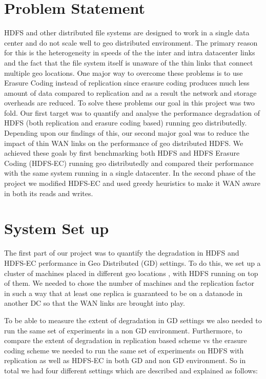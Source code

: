 \documentclass{sig-alternate-05-2015}
\begin{document}
\maketitle
\section{Problem Statement}
HDFS and other distributed file systems are designed to work in a single data center and do not scale well to geo distributed environment. The primary reason for this is the heterogeneity in speeds of the the inter and intra datacenter links and the fact that the file system itself is unaware of the thin links that connect multiple geo locations. One major way to overcome these problems is to use Erasure Coding instead of replication since erasure coding produces much less amount of data compared to replication and as a result the network and storage overheads are reduced. To solve these problems our goal in this project was two fold. Our first target was to quantify and analyse the performance degradation of HDFS (both replication and erasure coding based) running geo distributedly. Depending upon our findings of this, our second major goal was to reduce the impact of thin WAN links on the performance of geo distributed HDFS. We achieved these goals by first benchmarking both HDFS and HDFS Erasure Coding (HDFS-EC) running geo distributedly and compared their performance with the same system running in a single datacenter. In the second phase of the project we modified HDFS-EC and used greedy heuristics to make it WAN aware in both its reads and writes.

%
\printccsdesc



\section{System Set up}
The first part of our project was to quantify the degradation in HDFS and HDFS-EC performance in Geo Distributed (GD) settings. To do this, we set up a cluster of machines placed in different geo locations , with HDFS running on top of them. We needed to chose the number of machines and the replication factor in such a way that at least one replica is guaranteed to be on a datanode in another DC so that the WAN links are brought into play. 

To be able to measure the extent of degradation in GD settings we also needed to run the same set of experiments in a non GD environment. Furthermore, to compare the extent of degradation in replication based scheme vs the erasure coding scheme we needed to run the same set of experiments on HDFS with replication as well as HDFS-EC in both GD and non GD environment. So in total we had four different settings which are described and explained as follows:
\end{document}

